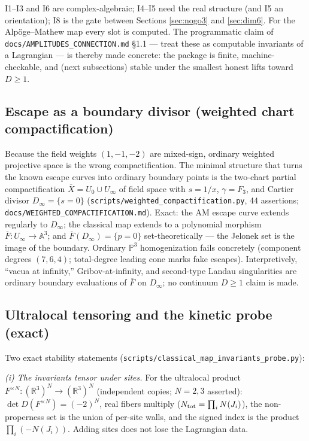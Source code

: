\documentclass[11pt]{article}
\theoremstyle{definition}
\theoremstyle{remark}
\newcommand{\R}{\mathbb{R}}
\begin{document}
I1--I3 and I6 are complex-algebraic; I4--I5 need the real structure
(and I5 an orientation); I8 is the gate between Sections
\ref{sec:nogo3} and \ref{sec:dim6}. For the Alp\"oge--Mathew map every
slot is computed. The programmatic claim of
\texttt{docs/AMPLITUDES\_CONNECTION.md} \S1.1 — treat these as
computable invariants of a Lagrangian — is thereby made concrete: the
package is finite, machine-checkable, and (next subsections) stable
under the smallest honest lifts toward $D\ge 1$.

\subsection{Escape as a boundary divisor (weighted chart
compactification)}\label{sec:compactify}

Because the field weights $(1,-1,-2)$ are mixed-sign, ordinary
weighted projective space is the wrong compactification. The minimal
structure that turns the known escape curves into ordinary boundary
points is the two-chart partial compactification
$\overline{X}=U_0\cup U_\infty$ of field space with
$s=1/x$, $\gamma=F_3$, and Cartier divisor $D_\infty=\{s=0\}$
(\texttt{scripts/weighted\_compactification.py}, 44 assertions;
\texttt{docs/WEIGHTED\_COMPACTIFICATION.md}). Exact: the AM escape
curve extends regularly to $D_\infty$; the classical map extends to a
polynomial morphism $\overline{F}\colon U_\infty\to\mathbb{A}^3$; and
$\overline{F}(D_\infty)=\{p=0\}$ set-theoretically --- the Jelonek
set is the image of the boundary. Ordinary $\mathbb{P}^3$
homogenization fails concretely (component degrees $(7,6,4)$;
total-degree leading cone marks fake escapes). Interpretively,
``vacua at infinity,'' Gribov-at-infinity, and second-type Landau
singularities are ordinary boundary evaluations of $\overline{F}$ on
$D_\infty$; no continuum $D\ge 1$ claim is made.

\subsection{Ultralocal tensoring and the kinetic probe (exact)}
\label{sec:ultralocal}

Two exact stability statements
(\texttt{scripts/classical\_map\_invariants\_probe.py}):

\emph{(i) The invariants tensor under sites.} For the ultralocal
product $F^{\times N}:(\R^3)^N\to(\R^3)^N$ (independent copies; $N=2,3$
asserted): $\det D(F^{\times N})=(-2)^N$, real fibers multiply
($N_{\rm tot}=\prod_i N(J_i)$), the non-properness set is the union of
per-site walls, and the signed index is the product
$\prod_i(-N(J_i))$. Adding sites does not lose the Lagrangian data.
\end{document}
